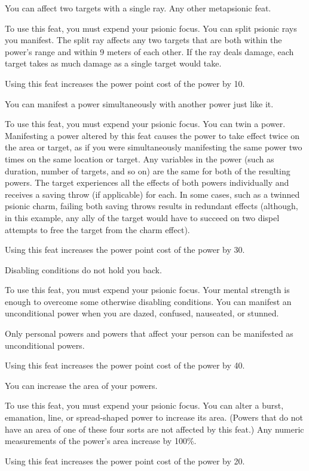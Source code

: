 {You can affect two targets with a single ray.}
{Any other metapsionic feat.}
{To use this feat, you must expend your psionic focus. You can split psionic rays you manifest. The split ray affects any two targets that are both within the power's range and within 9 meters of each other. If the ray deals damage, each target takes as much damage as a single target would take.

Using this feat increases the power point cost of the power by 10.}{}{}

{You can manifest a power simultaneously with another power just like it.}
{}
{To use this feat, you must expend your psionic focus. You can twin a power. Manifesting a power altered by this feat causes the power to take effect twice on the area or target, as if you were simultaneously manifesting the same power two times on the same location or target. Any variables in the power (such as duration, number of targets, and so on) are the same for both of the resulting powers. The target experiences all the effects of both powers individually and receives a saving throw (if applicable) for each. In some cases, such as a twinned psionic charm, failing both saving throws results in redundant effects (although, in this example, any ally of the target would have to succeed on two dispel attempts to free the target from the charm effect).

Using this feat increases the power point cost of the power by 30.}{}{}

{Disabling conditions do not hold you back.}
{}
{To use this feat, you must expend your psionic focus. Your mental strength is enough to overcome some otherwise disabling conditions. You can manifest an unconditional power when you are dazed, confused, nauseated, or stunned.

Only personal powers and powers that affect your person can be manifested as unconditional powers.

Using this feat increases the power point cost of the power by 40.}{}{}

{You can increase the area of your powers.}
{}
{To use this feat, you must expend your psionic focus. You can alter a burst, emanation, line, or spread-shaped power to increase its area. (Powers that do not have an area of one of these four sorts are not affected by this feat.) Any numeric measurements of the power's area increase by 100\%.

Using this feat increases the power point cost of the power by 20.}{}{}
